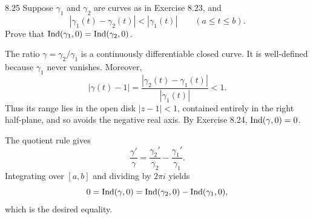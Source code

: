 \documentclass[11pt, oneside]{article}
\begin{document}
\begin{exercise}{8.25}
Suppose $\gamma_1$ and $\gamma_2$ are curves as in Exercise 8.23, and
\[
 |\gamma_1(t)-\gamma_2(t)|<|\gamma_1(t)|\qquad(a\le t\le b).
\]
Prove that $\operatorname{Ind}(\gamma_1, 0)=\operatorname{Ind}(\gamma_2, 0)$.
\end{exercise}
\begin{solution}
The ratio $\gamma=\gamma_2/\gamma_1$ is a continuously differentiable closed curve. It is well-defined because $\gamma_1$ never vanishes. Moreover,
\[
 |\gamma(t)-1|=\frac{|\gamma_2(t)-\gamma_1(t)|}{|\gamma_1(t)|}<1.
\]
Thus its range lies in the open disk $|z-1|<1$, contained entirely in the right half-plane, and so avoids the negative real axis. By Exercise 8.24, $\operatorname{Ind}(\gamma, 0)=0$.

The quotient rule gives
\[
 \frac{\gamma'}\gamma=\frac{\gamma_2'}{\gamma_2}-\frac{\gamma_1'}{\gamma_1}.
\]
Integrating over $[a, b]$ and dividing by $2\pi i$ yields
\[
 0=\operatorname{Ind}(\gamma, 0)
 =\operatorname{Ind}(\gamma_2, 0)-\operatorname{Ind}(\gamma_1, 0),
\]
which is the desired equality.
\end{solution}
\end{document}
